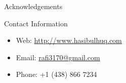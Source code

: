 \documentclass[final]{beamer}
\newlength{\onecolwid}
\begin{document}
\begin{frame}[t]
\begin{columns}[t]
\begin{column}{\onecolwid}
\begin{block}{Acknowledgements}
\end{block}



\begin{alertblock}{Contact Information}

\begin{itemize}
\item Web: \href{http://www.hasibulhuq.com}{http://www.hasibulhuq.com}
\item Email: \href{mailto:rafi3170@gmail.com}{rafi3170@gmail.com}
\item Phone: +1 (438) 866 7234
\end{itemize}

\end{alertblock}



\end{column} %

\end{columns} %

\end{frame} %
\end{document}
